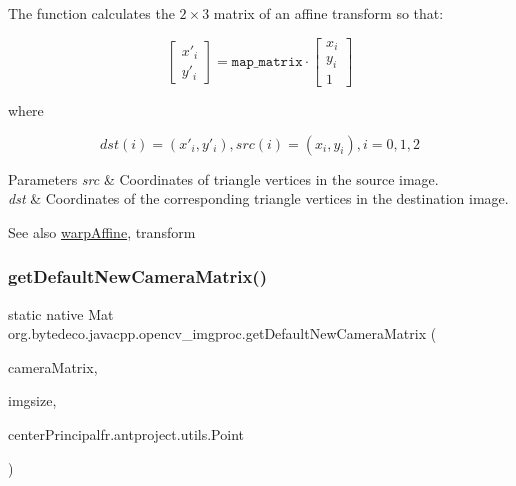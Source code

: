 The function calculates the $2 \times 3$ matrix of an affine transform so that\+: 

\[\begin{bmatrix} x'_i \\ y'_i \end{bmatrix} = \texttt{map_matrix} \cdot \begin{bmatrix} x_i \\ y_i \\ 1 \end{bmatrix}\] 

where 

\[dst(i)=(x'_i,y'_i), src(i)=(x_i, y_i), i=0,1,2\] 


\begin{DoxyParams}{Parameters}
{\em src} & Coordinates of triangle vertices in the source image. \\
\hline
{\em dst} & Coordinates of the corresponding triangle vertices in the destination image. \\
\hline
\end{DoxyParams}
\begin{DoxySeeAlso}{See also}
\hyperlink{group__imgproc__transform_ga0f7c28988998c3ae473a6708bdeef114}{warp\+Affine}, transform 
\end{DoxySeeAlso}
\mbox{\label{group__imgproc__transform_gadf9fb3deefd512a073b449832fe60679}} 
\subsubsection{\texorpdfstring{get\+Default\+New\+Camera\+Matrix()}{getDefaultNewCameraMatrix()}}
{\footnotesize\ttfamily static native Mat org.\+bytedeco.\+javacpp.\+opencv\+\_\+imgproc.\+get\+Default\+New\+Camera\+Matrix (\begin{DoxyParamCaption}\item[{@By\+Val Mat}]{camera\+Matrix,  }\item[{@By\+Val(null\+Value=\char`\"{}cv\+::\+Size()\char`\"{}) Size}]{imgsize,  }\item[{@Cast(\char`\"{}bool\char`\"{}) boolean}]{center\+Principal\+fr.antproject.utils.Point }\end{DoxyParamCaption})\hspace{0.3cm}{\ttfamily [static]}}



